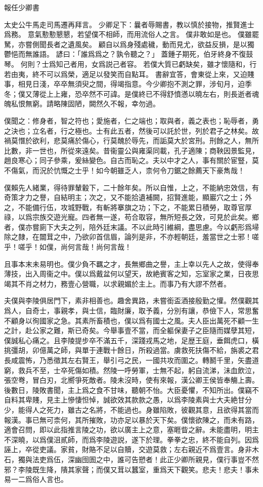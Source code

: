 報任少卿書

太史公牛馬走司馬遷再拜言。
少卿足下：曩者辱賜書，教以慎於接物，推賢進士爲務。
意氣懃懃懇懇，若望僕不相師，而用流俗人之言。
僕非敢如是也。
僕雖罷駑，亦嘗側聞長者之遺風矣。
顧自以爲身殘處穢，動而見尤，欲益反損，是以獨鬱悒而無誰語。
諺曰：「誰爲爲之？孰令聽之？」
蓋鍾子期死，伯牙終身不復鼓琴。
何則？士爲知己者用，女爲説己者容。
若僕大質已虧缺矣，雖才懷隨和，行若由夷，終不可以爲榮，適足以發笑而自點耳。
書辭宜答，會東從上來，又迫賤事，相見日淺，卒卒無須臾之間，得竭指意。今少卿抱不測之罪，涉旬月，迫季冬；僕又薄從上上雍，恐卒然不可諱。是僕終已不得舒憤懣以曉左右，則長逝者魂魄私恨無窮。請略陳固陋，闕然久不報，幸勿過。

僕聞之：修身者，智之符也；愛施者，仁之端也；取與者，義之表也；恥辱者，勇之決也；立名者，行之極也。士有此五者，然後可以託於世，列於君子之林矣。故禍莫憯於欲利，悲莫痛於傷心，行莫醜於辱先，而詬莫大於宮刑。刑餘之人，無所比數，非一世也，所從來遠矣。昔衞靈公與雍渠同載，孔子適陳；商鞅因景監見，趙良寒心；同子參乘，爰絲變色。自古而恥之。夫以中才之人，事有關於宦豎，莫不傷氣，而況於忼慨之士乎！如今朝雖乏人，柰何令刀鋸之餘薦天下豪雋哉！

僕賴先人緒業，得待罪輦轂下，二十餘年矣。所以自惟，上之，不能納忠效信，有奇策才力之譽，自結明主；次之，又不能拾遺補闕，招賢進能，顯巖穴之士；外之，不能備行伍，攻城野戰，有斬將搴旗之功；下之，不能累日積勞，取尊官厚祿，以爲宗族交遊光寵。四者無一遂，苟合取容，無所短長之效，可見於此矣。鄉者，僕亦嘗廁下大夫之列，陪外廷末議。不以此時引維綱，盡思慮。今以虧形爲埽除之隸，在闒茸之中，乃欲卯首信眉，論列是非，不亦輕朝廷，羞當世之士邪！嗟乎！嗟乎！如僕，尚何言哉！尚何言哉！

且事本末未易明也。僕少負不羈之才，長無鄉曲之譽，主上幸以先人之故，使得奉薄技，出入周衞之中。僕以爲戴盆何以望天，故絶賓客之知，忘室家之業，日夜思竭其不肖之材力，務壹心營職，以求親媚於主上。而事乃有大謬不然者。

夫僕與李陵俱居門下，素非相善也。趣舍異路，未嘗銜盃酒接殷勤之懽。然僕觀其爲人，自奇士，事親孝，與士信，臨財廉，取予義，分別有讓，恭儉下人，常思奮不顧身以徇國家之急。其素所畜積也，僕以爲有國士之風。夫人臣出萬死不顧一生之計，赴公家之難，斯已奇矣。今舉事壹不當，而全軀保妻子之臣隨而媒孽其短，僕誠私心痛之。且李陵提步卒不滿五千，深踐戎馬之地，足歴王庭，垂餌虎口，橫挑彊胡，卯億萬之師，與單于連戰十餘日，所殺過當。虜救死扶傷不給，旃裘之君長咸震怖，乃悉徵其左右賢王，舉引弓之民，一國共攻而圍之。轉鬭千里，矢盡道窮，救兵不至，士卒死傷如積。然陵一呼勞軍，士無不起，躬自流涕，沬血飲泣，張空弮，冒白刃，北嚮爭死敵者。陵未沒時，使有來報，漢公卿王侯皆奉觴上壽。後數日，陵敗書聞，主上爲之食不甘味，聽朝不怡。大臣憂懼，不知所出。僕竊不自料其卑賤，見主上慘悽怛悼，誠欲效其款款之愚，以爲李陵素與士大夫絶甘分少，能得人之死力，雖古之名將，不能過也。身雖陷敗，彼觀其意，且欲得其當而報漢。事已無可柰何，其所摧敗，功亦足以暴於天下矣。僕懷欲陳之，而未有路，適會召問，即以此指推言陵之功，欲以廣主上之意，塞睚眥之辭。未能盡明，明主不深曉，以爲僕沮貳師，而爲李陵遊説，遂下於理。拳拳之忠，終不能自列。因爲誣上，卒從吏議。家貧，財賂不足以自贖，交遊莫救；左右親近不爲壹言。身非木石，獨與法吏爲伍，深幽囹圄之中，誰可告愬者！此正少卿所親見，僕行事豈不然邪？李陵既生降，隤其家聲；而僕又茸以蠶室，重爲天下觀笑。悲夫！悲夫！事未易一二爲俗人言也。

